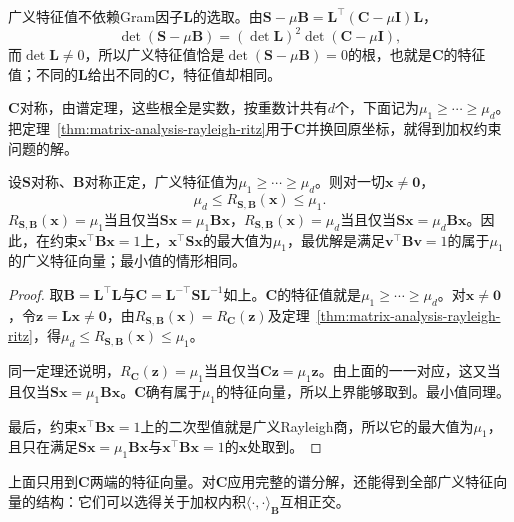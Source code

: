 广义特征值不依赖Gram因子$\bm L$的选取。由$\bm S-\mu\bm B=\bm L^\top(\bm C-\mu\bm I)\bm L$，
\[
 \det(\bm S-\mu\bm B)=(\det\bm L)^2\det(\bm C-\mu\bm I),
\]
而$\det\bm L\neq0$，所以广义特征值恰是$\det(\bm S-\mu\bm B)=0$的根，也就是$\bm C$的特征值；不同的$\bm L$给出不同的$\bm C$，特征值却相同。

$\bm C$对称，由谱定理，这些根全是实数，按重数计共有$d$个，下面记为$\mu_1\geq\cdots\geq\mu_d$。把定理~\ref{thm:matrix-analysis-rayleigh-ritz}用于$\bm C$并换回原坐标，就得到加权约束问题的解。

\begin{theorem}[广义Rayleigh商的极值]
\label{thm:ls-generalized-rayleigh-extremal}
设$\bm S$对称、$\bm B$对称正定，广义特征值为$\mu_1\geq\cdots\geq\mu_d$。则对一切$\bm x\neq\bm0$，
\[
 \mu_d\leq R_{\bm S,\bm B}(\bm x)\leq\mu_1 .
\]
$R_{\bm S,\bm B}(\bm x)=\mu_1$当且仅当$\bm S\bm x=\mu_1\bm B\bm x$，$R_{\bm S,\bm B}(\bm x)=\mu_d$当且仅当$\bm S\bm x=\mu_d\bm B\bm x$。因此，在约束$\bm x^\top\bm B\bm x=1$上，$\bm x^\top\bm S\bm x$的最大值为$\mu_1$，最优解是满足$\bm v^\top\bm B\bm v=1$的属于$\mu_1$的广义特征向量；最小值的情形相同。
\end{theorem}
\begin{proof}
取$\bm B=\bm L^\top\bm L$与$\bm C=\bm L^{-\top}\bm S\bm L^{-1}$如上。$\bm C$的特征值就是$\mu_1\geq\cdots\geq\mu_d$。对$\bm x\neq\bm0$，令$\bm z=\bm L\bm x\neq\bm0$，由$R_{\bm S,\bm B}(\bm x)=R_{\bm C}(\bm z)$及定理~\ref{thm:matrix-analysis-rayleigh-ritz}，得$\mu_d\leq R_{\bm S,\bm B}(\bm x)\leq\mu_1$。

同一定理还说明，$R_{\bm C}(\bm z)=\mu_1$当且仅当$\bm C\bm z=\mu_1\bm z$。由上面的一一对应，这又当且仅当$\bm S\bm x=\mu_1\bm B\bm x$。$\bm C$确有属于$\mu_1$的特征向量，所以上界能够取到。最小值同理。

最后，约束$\bm x^\top\bm B\bm x=1$上的二次型值就是广义Rayleigh商，所以它的最大值为$\mu_1$，且只在满足$\bm S\bm x=\mu_1\bm B\bm x$与$\bm x^\top\bm B\bm x=1$的$\bm x$处取到。
\end{proof}

上面只用到$\bm C$两端的特征向量。对$\bm C$应用完整的谱分解，还能得到全部广义特征向量的结构：它们可以选得关于加权内积$\langle\cdot,\cdot\rangle_{\bm B}$互相正交。

